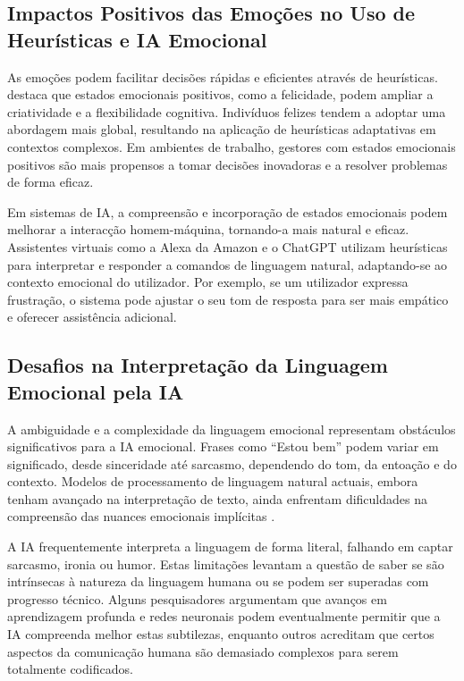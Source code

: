 \documentclass[a4paper,12pt]{report}
\begin{document}
	\subsection{Impactos Positivos das Emoções no Uso de Heurísticas e IA Emocional}
	
	As emoções podem facilitar decisões rápidas e eficientes através de heurísticas. \textcite{isen2001} destaca que estados emocionais positivos, como a felicidade, podem ampliar a criatividade e a flexibilidade cognitiva. Indivíduos felizes tendem a adoptar uma abordagem mais global, resultando na aplicação de heurísticas adaptativas em contextos complexos. Em ambientes de trabalho, gestores com estados emocionais positivos são mais propensos a tomar decisões inovadoras e a resolver problemas de forma eficaz.
	
	Em sistemas de IA, a compreensão e incorporação de estados emocionais podem melhorar a interacção homem-máquina, tornando-a mais natural e eficaz. Assistentes virtuais como a Alexa da Amazon e o ChatGPT utilizam heurísticas para interpretar e responder a comandos de linguagem natural, adaptando-se ao contexto emocional do utilizador. Por exemplo, se um utilizador expressa frustração, o sistema pode ajustar o seu tom de resposta para ser mais empático e oferecer assistência adicional.
	
	\subsection{Desafios na Interpretação da Linguagem Emocional pela IA}
	
	A ambiguidade e a complexidade da linguagem emocional representam obstáculos significativos para a IA emocional. Frases como “Estou bem” podem variar em significado, desde sinceridade até sarcasmo, dependendo do tom, da entoação e do contexto. Modelos de processamento de linguagem natural actuais, embora tenham avançado na interpretação de texto, ainda enfrentam dificuldades na compreensão das nuances emocionais implícitas \parencite{russell2020}.
	
	A IA frequentemente interpreta a linguagem de forma literal, falhando em captar sarcasmo, ironia ou humor. Estas limitações levantam a questão de saber se são intrínsecas à natureza da linguagem humana ou se podem ser superadas com progresso técnico. Alguns pesquisadores argumentam que avanços em aprendizagem profunda e redes neuronais podem eventualmente permitir que a IA compreenda melhor estas subtilezas, enquanto outros acreditam que certos aspectos da comunicação humana são demasiado complexos para serem totalmente codificados.
	
\end{document}
